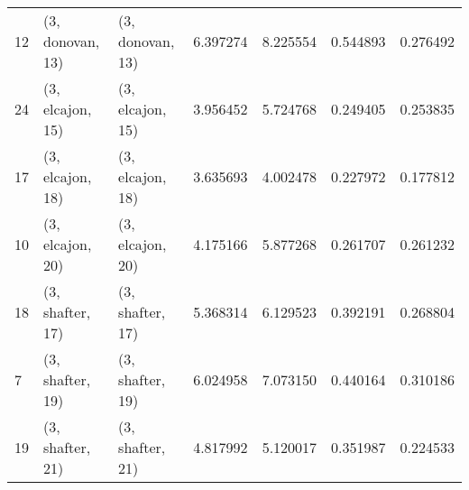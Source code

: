 \begin{tabular}{lllrrrr}
12 &  (3, donovan, 13) &  (3, donovan, 13) &  6.397274 &  8.225554 &   0.544893 &  0.276492 \\
24 &  (3, elcajon, 15) &  (3, elcajon, 15) &  3.956452 &  5.724768 &   0.249405 &  0.253835 \\
17 &  (3, elcajon, 18) &  (3, elcajon, 18) &  3.635693 &  4.002478 &   0.227972 &  0.177812 \\
10 &  (3, elcajon, 20) &  (3, elcajon, 20) &  4.175166 &  5.877268 &   0.261707 &  0.261232 \\
18 &  (3, shafter, 17) &  (3, shafter, 17) &  5.368314 &  6.129523 &   0.392191 &  0.268804 \\
7  &  (3, shafter, 19) &  (3, shafter, 19) &  6.024958 &  7.073150 &   0.440164 &  0.310186 \\
19 &  (3, shafter, 21) &  (3, shafter, 21) &  4.817992 &  5.120017 &   0.351987 &  0.224533 \\
\bottomrule
\end{tabular}
